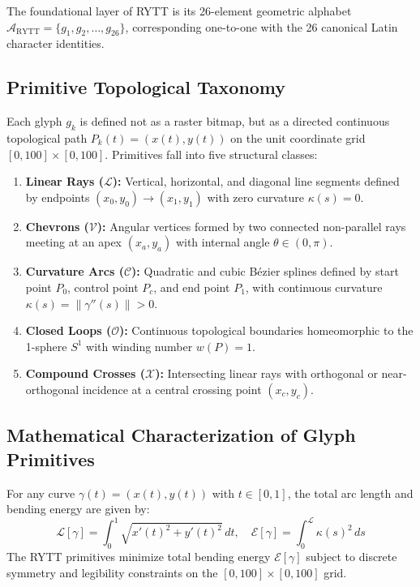 \documentclass[11pt,oneside,letterpaper]{article}
\theoremstyle{sovereignstyle}
\begin{document}
The foundational layer of RYTT is its 26-element geometric alphabet $\mathcal{A}_{\text{RYTT}} = \{g_1, g_2, \dots, g_{26}\}$, corresponding one-to-one with the 26 canonical Latin character identities. 

\subsection{Primitive Topological Taxonomy}
Each glyph $g_k$ is defined not as a raster bitmap, but as a directed continuous topological path $P_k(t) = (x(t), y(t))$ on the unit coordinate grid $[0, 100] \times [0, 100]$. Primitives fall into five structural classes:
\begin{enumerate}
  \item \textbf{Linear Rays ($\mathcal{L}$):} Vertical, horizontal, and diagonal line segments defined by endpoints $(x_0, y_0) \to (x_1, y_1)$ with zero curvature $\kappa(s) = 0$.
  \item \textbf{Chevrons ($\mathcal{V}$):} Angular vertices formed by two connected non-parallel rays meeting at an apex $(x_a, y_a)$ with internal angle $\theta \in (0, \pi)$.
  \item \textbf{Curvature Arcs ($\mathcal{C}$):} Quadratic and cubic Bézier splines defined by start point $P_0$, control point $P_c$, and end point $P_1$, with continuous curvature $\kappa(s) = \|\gamma''(s)\| > 0$.
  \item \textbf{Closed Loops ($\mathcal{O}$):} Continuous topological boundaries homeomorphic to the 1-sphere $S^1$ with winding number $w(P) = 1$.
  \item \textbf{Compound Crosses ($\mathcal{X}$):} Intersecting linear rays with orthogonal or near-orthogonal incidence at a central crossing point $(x_c, y_c)$.
\end{enumerate}

\subsection{Mathematical Characterization of Glyph Primitives}
For any curve $\gamma(t) = (x(t), y(t))$ with $t \in [0, 1]$, the total arc length and bending energy are given by:
\begin{equation}
\mathcal{L}[\gamma] = \int_0^1 \sqrt{x'(t)^2 + y'(t)^2} \, dt, \quad \mathcal{E}[\gamma] = \int_0^{\mathcal{L}} \kappa(s)^2 \, ds
\end{equation}
The RYTT primitives minimize total bending energy $\mathcal{E}[\gamma]$ subject to discrete symmetry and legibility constraints on the $[0, 100] \times [0, 100]$ grid.
\end{document}
